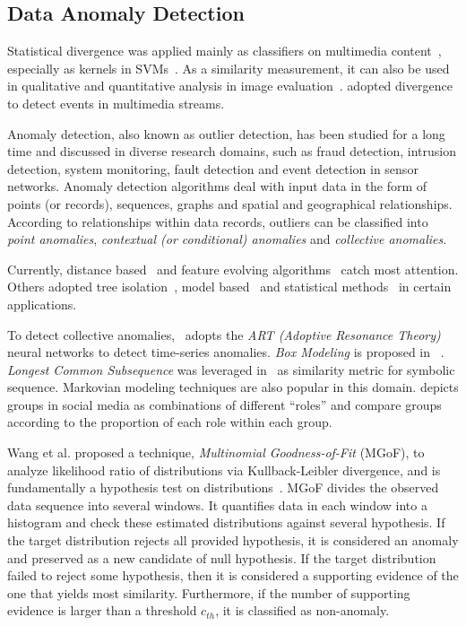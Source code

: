 \documentclass[10pt,conference,letterpaper]{article}
\begin{document}
		\subsection{Data Anomaly Detection}
			Statistical divergence was applied mainly as classifiers on multimedia content~\cite{park2005classification}, especially as kernels in SVMs~\cite{moreno2004kullback}. As a similarity measurement, it can also be used in qualitative and quantitative analysis in image evaluation~\cite{pheng2016kullback,goldberger2003efficient}. \cite{amid2014unsupervised} adopted divergence to detect events in multimedia streams.
		
			Anomaly detection, also known as outlier detection, has been studied for a long time and discussed in diverse research domains, such as fraud detection, intrusion detection, system monitoring, fault detection and event detection in sensor networks.
			Anomaly detection algorithms deal with input data in the form of points (or records), sequences, graphs and spatial and geographical relationships.~\cite{chandola2009anomaly} According to relationships within data records, outliers can be classified into \textit{point anomalies}, \textit{contextual (or conditional) anomalies} and \textit{collective anomalies}.~\cite{goldberger2000components}
			
			Currently, distance based~\cite{cao2014scalable,cao2017multi} and feature evolving algorithms~\cite{masud2013classification,li2015discovery,shao2014prototype} catch most attention. Others adopted tree isolation~\cite{zhang2017lshiforest}, model based~\cite{yin2016model} and statistical methods~\cite{zhu2002statstream} in certain applications.
	
			To detect collective anomalies,~\cite{caudell1993adaptive} adopts the \textit{ART (Adoptive Resonance Theory)} neural networks to detect time-series anomalies. \textit{Box Modeling} is proposed in ~\cite{chan2005modeling}. \textit{Longest Common Subsequence} was leveraged in~\cite{budalakoti2006anomaly} as similarity metric for symbolic sequence. Markovian modeling techniques are also popular in this domain\cite{ye2000markov,warrender1999detecting,pavlov2003sequence}. \cite{yu2015glad} depicts groups in social media as combinations of different ``roles'' and compare groups according to the proportion of each role within each group.
			
			Wang et al. proposed a technique, \textit{Multinomial Goodness-of-Fit} (MGoF), to analyze likelihood ratio of distributions via Kullback-Leibler divergence, and is fundamentally a hypothesis test on distributions~\cite{wang2011statistical}.
			MGoF divides the observed data sequence into several windows. It quantifies data in each window into a histogram and check these estimated distributions against several hypothesis. If the target distribution rejects all provided hypothesis, it is considered an anomaly and preserved as a new candidate of null hypothesis. If the target distribution failed to reject some hypothesis, then it is considered a supporting evidence of the one that yields most similarity. Furthermore, if the number of supporting evidence is larger than a threshold $c_{th}$, it is classified as non-anomaly.
			
\end{document}
